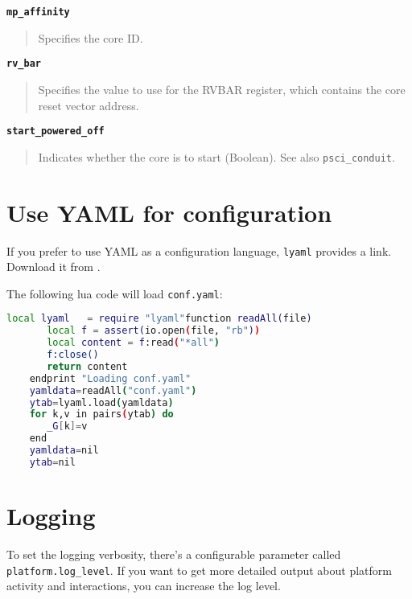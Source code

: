 {\textbf {\footnotesize{\lstinline!mp_affinity!}}}
\vspace{-2pt}
\begin{quote}
Specifies the core ID.
\end{quote}


{\textbf {\footnotesize{\lstinline!rv_bar!}}}
\vspace{-2pt}
\begin{quote}
Specifies the value to use for the RVBAR register, which contains the core reset vector address.
\end{quote}


{\textbf {\footnotesize{\lstinline!start_powered_off!}}}
\vspace{-2pt}
\begin{quote}
Indicates whether the core is to start (Boolean). See also {\small{\lstinline!psci_conduit!}}.
\end{quote}


\section{Use YAML for configuration}

If you prefer to use YAML as a configuration language, {\small{\lstinline!lyaml!}} provides a link. Download it from {}.

The following lua code will load {\small{\lstinline!conf.yaml!}}:

\small
\begin{lstlisting}[language=bash]
    local lyaml   = require "lyaml"function readAll(file)
       local f = assert(io.open(file, "rb"))
       local content = f:read("*all")
       f:close()
       return content
    endprint "Loading conf.yaml"
    yamldata=readAll("conf.yaml")
    ytab=lyaml.load(yamldata)
    for k,v in pairs(ytab) do
       _G[k]=v
    end
    yamldata=nil
    ytab=nil
\end{lstlisting}
\normalsize


\clearpage
\section{Logging}
\label{sec:logging}

To set the logging verbosity, there's a configurable parameter called
{\small{\lstinline!platform.log_level!}}.  If you want to get more
detailed output about platform activity and interactions, you can
increase the log level.

